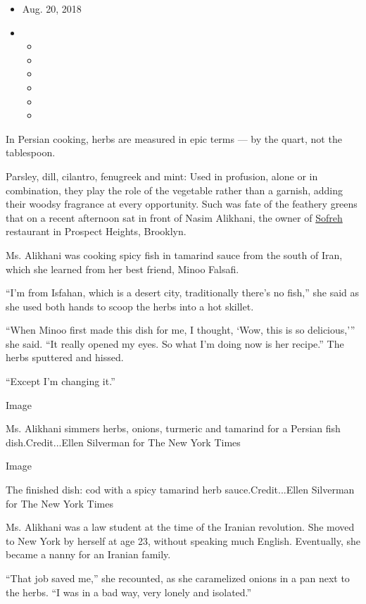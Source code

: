 \begin{itemize}
\item
  Aug. 20, 2018
\item
  \begin{itemize}
  \item
  \item
  \item
  \item
  \item
  \item
  \end{itemize}
\end{itemize}

In Persian cooking, herbs are measured in epic terms --- by the quart,
not the tablespoon.

Parsley, dill, cilantro, fenugreek and mint: Used in profusion, alone or
in combination, they play the role of the vegetable rather than a
garnish, adding their woodsy fragrance at every opportunity. Such was
fate of the feathery greens that on a recent afternoon sat in front of
Nasim Alikhani, the owner of \href{http://www.sofrehnyc.com/}{Sofreh}
restaurant in Prospect Heights, Brooklyn.

Ms. Alikhani was cooking spicy fish in tamarind sauce from the south of
Iran, which she learned from her best friend, Minoo Falsafi.

``I'm from Isfahan, which is a desert city, traditionally there's no
fish,'' she said as she used both hands to scoop the herbs into a hot
skillet.

``When Minoo first made this dish for me, I thought, `Wow, this is so
delicious,''' she said. ``It really opened my eyes. So what I'm doing
now is her recipe.'' The herbs sputtered and hissed.

``Except I'm changing it.''

Image

Ms. Alikhani simmers herbs, onions, turmeric and tamarind for a Persian
fish dish.Credit...Ellen Silverman for The New York Times

Image

The finished dish: cod with a spicy tamarind herb sauce.Credit...Ellen
Silverman for The New York Times

Ms. Alikhani was a law student at the time of the Iranian revolution.
She moved to New York by herself at age 23, without speaking much
English. Eventually, she became a nanny for an Iranian family.

``That job saved me,'' she recounted, as she caramelized onions in a pan
next to the herbs. ``I was in a bad way, very lonely and isolated.''

